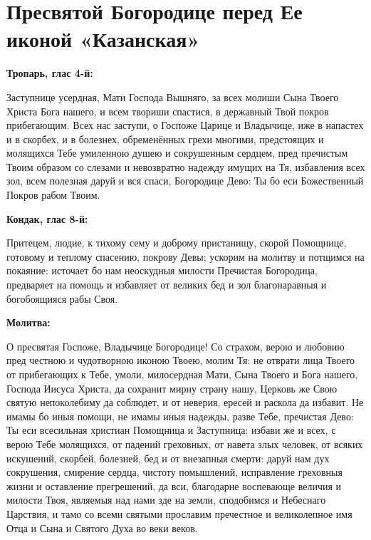 \section{Пресвятой Богородице перед Ее иконой «Казанская»}
 


\bfseries Тропарь, глас 4-й:\normalfont{}\nopagebreak


Заступнице усердная,  Мати Господа Вышняго,  за всех молиши Сына Твоего Христа Бога нашего,  и всем твориши спастися,  в державный Твой покров прибегающим.  Всех нас заступи, о Госпоже Царице и Владычице,  иже в напастех и в скорбех, и в болезнех, обременённых грехи многими,  предстоящих и молящихся Тебе умиленною душею и сокрушенным сердцем,  пред пречистым Твоим образом со слезами  и невозвратно надежду имущих на Тя,  избавления всех зол,  всем полезная даруй  и вся спаси, Богородице Дево:  Ты бо еси Божественный Покров рабом Твоим.


\medskip


\bfseries Кондак, глас 8-й:\normalfont{}\nopagebreak


Притецем, людие, к тихому сему и доброму пристанищу, скорой Помощнице, готовому и теплому спасению, покрову Девы; ускорим на молитву и потщимся на покаяние: источает бо нам неоскудныя милости Пречистая Богородица, предваряет на помощь и избавляет от великих бед и зол благонаравныя и богобоящияся рабы Своя.


\medskip


\bfseries Молитва:\normalfont{}\nopagebreak


О пресвятая Госпоже, Владычице Богородице! Со страхом, верою и любовию пред честною и чудотворною иконою Твоею, молим Тя: не отврати лица Твоего от прибегающих к Тебе, умоли, милосердная Мати, Сына Твоего и Бога нашего, Господа Иисуса Христа, да сохранит мирну страну нашу, Церковь же Свою святую непоколебиму да соблюдет, и от неверия, ересей и раскола да избавит. Не имамы бо иныя помощи, не имамы иныя надежды, разве Тебе, пречистая Дево: Ты еси всесильная христиан Помощница и Заступница: избави же и всех, с верою Тебе молящихся, от падений греховных, от навета злых человек, от всяких искушений, скорбей, болезней, бед и от внезапныя смерти: даруй нам дух сокрушения, смирение сердца, чистоту помышлений, исправление греховныя жизни и оставление прегрешений, да вси, благодарне воспевающе величия и милости Твоя, являемыя над нами зде на земли, сподобимся и Небеснаго Царствия, и тамо со всеми святыми прославим пречестное и великолепное имя Отца и Сына и Святого Духа во веки веков.


